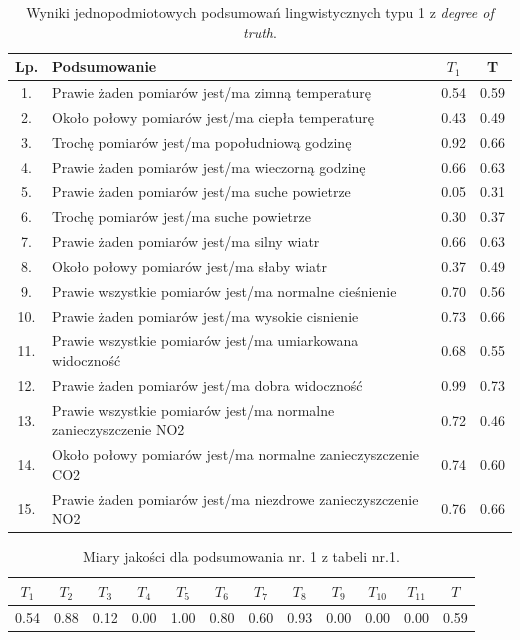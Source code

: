 \documentclass{article}
\begin{document}
\begin{table}[H]
    \centering
    \normalsize
    \begin{tabular}{|c|p{8cm}|c|c|}
    \hline
    \textbf{Lp.} &\textbf{Podsumowanie} & \textbf{\(T_1\)} & \textbf{T} \\ \hline
    1. & Prawie żaden pomiarów jest/ma zimną temperaturę & 0.54 & 0.59 \\ \hline
    2. & Około połowy pomiarów jest/ma ciepła temperaturę & 0.43 & 0.49 \\ \hline
    3. & Trochę pomiarów  jest/ma popołudniową godzinę & 0.92 & 0.66 \\ \hline
    4. & Prawie żaden pomiarów jest/ma wieczorną godzinę & 0.66 & 0.63 \\ \hline
    5. & Prawie żaden pomiarów jest/ma suche powietrze & 0.05 & 0.31 \\ \hline
    6. & Trochę pomiarów jest/ma suche powietrze & 0.30 & 0.37 \\ \hline
    7. & Prawie żaden pomiarów jest/ma silny wiatr & 0.66 & 0.63 \\ \hline
    8. & Około połowy pomiarów jest/ma słaby wiatr & 0.37 & 0.49 \\ \hline
    9. & Prawie wszystkie pomiarów jest/ma normalne cieśnienie & 0.70 & 0.56 \\ \hline
    10. & Prawie żaden pomiarów  jest/ma wysokie cisnienie & 0.73 & 0.66 \\ \hline
    11. & Prawie wszystkie pomiarów jest/ma umiarkowana widoczność & 0.68 & 0.55 \\ \hline
    12. & Prawie żaden pomiarów jest/ma dobra widoczność & 0.99 & 0.73 \\ \hline
    13. & Prawie wszystkie pomiarów  jest/ma normalne zanieczyszczenie NO2 & 0.72 & 0.46 \\ \hline
    14. & Około połowy pomiarów  jest/ma normalne zanieczyszczenie CO2 & 0.74 & 0.60 \\ \hline
    15. & Prawie żaden pomiarów  jest/ma niezdrowe zanieczyszczenie NO2 & 0.76 & 0.66 \\ \hline

    \end{tabular}
    \caption{Wyniki jednopodmiotowych podsumowań lingwistycznych typu 1 z \textit{degree of truth}.}
\end{table}

  \begin{table}[H]
    \centering
    \begin{tabular}{|c|c|c|c|c|c|c|c|c|c|c|c|}
    \hline
    \textbf{\(T_1\)} &\textbf{\(T_2\)} & \textbf{\(T_3\)} & \textbf{\(T_4\)} & \textbf{\(T_5\)} & \textbf{\(T_6\)} & \textbf{\(T_7\)} & \textbf{\(T_8\)} & \textbf{\(T_9\)} & \textbf{\(T_{10}\)} & \textbf{\(T_{11}\)} & \textbf{\(T\)} \\ \hline
    0.54 & 0.88 & 0.12 & 0.00 & 1.00 & 0.80 & 0.60 & 0.93 & 0.00 & 0.00 & 0.00 & 0.59 \\ \hline
    \end{tabular}
    \caption{Miary jakości dla podsumowania nr. 1 z tabeli nr.1.}
\end{table}  
\end{document}
